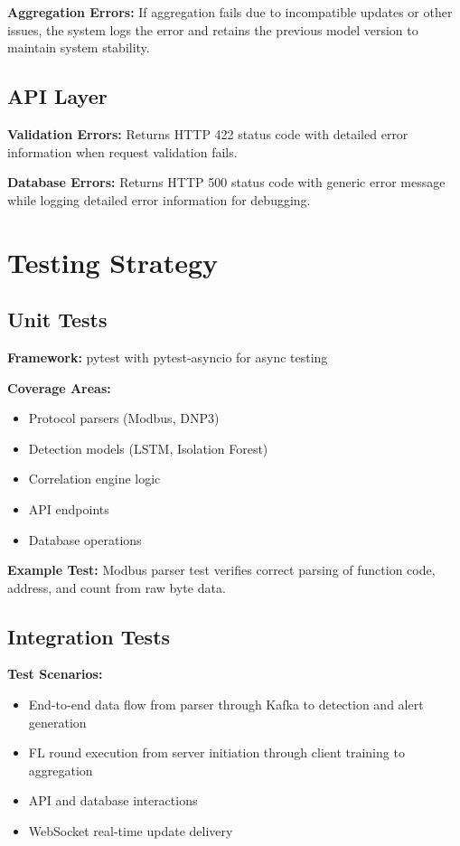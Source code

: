 \documentclass[12pt,a4paper]{article}
\begin{document}
\textbf{Aggregation Errors:}
If aggregation fails due to incompatible updates or other issues, the system logs the error and retains the previous model version to maintain system stability.

\subsection{API Layer}

\textbf{Validation Errors:}
Returns HTTP 422 status code with detailed error information when request validation fails.

\textbf{Database Errors:}
Returns HTTP 500 status code with generic error message while logging detailed error information for debugging.

\section{Testing Strategy}

\subsection{Unit Tests}

\textbf{Framework:} pytest with pytest-asyncio for async testing

\textbf{Coverage Areas:}
\begin{itemize}[leftmargin=1cm,itemsep=0pt]
    \item Protocol parsers (Modbus, DNP3)
    \item Detection models (LSTM, Isolation Forest)
    \item Correlation engine logic
    \item API endpoints
    \item Database operations
\end{itemize}

\textbf{Example Test:} Modbus parser test verifies correct parsing of function code, address, and count from raw byte data.

\subsection{Integration Tests}

\textbf{Test Scenarios:}
\begin{itemize}[leftmargin=1cm,itemsep=0pt]
    \item End-to-end data flow from parser through Kafka to detection and alert generation
    \item FL round execution from server initiation through client training to aggregation
    \item API and database interactions
    \item WebSocket real-time update delivery
\end{itemize}
\end{document}
